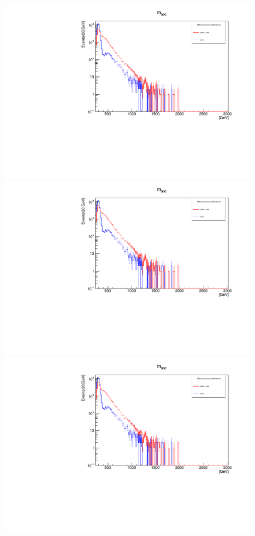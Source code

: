 \documentclass[a4wide,10pt]{article}
\begin{document}
\includegraphics[scale=0.50,page=1]{InterferencePlots10p.pdf}
\includegraphics[scale=0.50,page=2]{InterferencePlots10p.pdf}
\includegraphics[scale=0.50,page=3]{InterferencePlots10p.pdf}
\end{document}

